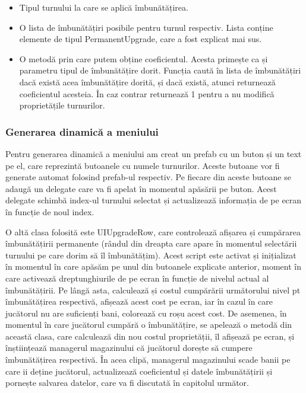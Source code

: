\documentclass[12pt, a4paper]{article}
\begin{document}
	\begin{itemize}
		\item Tipul turnului la care se aplică îmbunătățirea.
		\item O lista de îmbunătățiri posibile pentru turnul respectiv. Lista conține elemente de tipul PermanentUpgrade, care a fost explicat mai sus.
		\item O metodă prin care putem obține coeficientul. Acesta primește ca și parametru tipul de îmbunătățire dorit. Funcția caută în lista de îmbunătățiri dacă există acea îmbunătățire dorită, și dacă există, atunci returnează coeficientul acesteia. În caz contrar returnează 1 pentru a nu modifică proprietățile turnurilor.
	\end{itemize}
	
	\subsubsection{Generarea dinamică a meniului}
	
	Pentru generarea dinamică a meniului am creat un prefab cu un buton și un text pe el, care reprezintă butoanele cu numele turnurilor. Aceste butoane vor fi generate automat folosind prefab-ul respectiv. Pe fiecare din aceste butoane se adaugă un delegate care va fi apelat în momentul apăsării pe buton. Acest delegate schimbă index-ul turnului selectat și actualizează informația de pe ecran în funcție de noul index.
	\newline
	
	O altă clasa folosită este UIUpgradeRow, care controlează afișarea și cumpărarea îmbunătățirii permanente (rândul din dreapta care apare în momentul selectării turnului pe care dorim să îl îmbunătățim). Acest script este activat și inițializat în momentul în care apăsăm pe unul din butoanele explicate anterior, moment în care activează dreptunghiurile de pe ecran în funcție de nivelul actual al îmbunătățirii. Pe lângă asta, calculează și costul cumpărării următorului nivel pt îmbunătățirea respectivă, afișează acest cost pe ecran, iar în cazul în care jucătorul nu are suficienți bani, colorează cu roșu acest cost. De asemenea, în momentul în care jucătorul cumpără o îmbunătățire, se apelează o metodă din această clasa, care calculează din nou costul proprietății, îl afișează pe ecran, și înștiințează managerul magazinului că jucătorul dorește să cumpere îmbunătățirea respectivă. În acea clipă, managerul magazinului scade banii pe care ii deține jucătorul, actualizează coeficientul și datele îmbunătățirii și pornește salvarea datelor, care va fi discutată în capitolul următor.
	\newline
	
\end{document}
